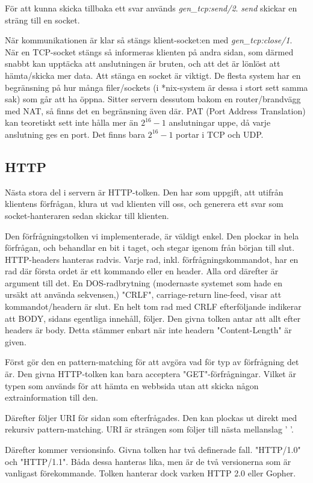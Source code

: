 \documentclass[a4paper, 11pt]{article}
\begin{document}
För att kunna skicka tillbaka ett svar används \emph{gen\_tcp:send/2}. \emph{send} skickar en sträng till en socket.

När kommunikationen är klar så stängs klient-socket:en med \emph{gen\_tcp:close/1}. När en TCP-socket stängs
så informeras klienten på andra sidan, som därmed snabbt kan upptäcka att anslutningen är bruten, och att
det är lönlöst att hämta/skicka mer data. Att stänga en socket är viktigt. De flesta system har en begränsning
på hur många filer/sockets (i *nix-system är dessa i stort sett samma sak) som går att ha öppna. Sitter servern
dessutom bakom en router/brandvägg med NAT, så finns det en begränsning även där. PAT (Port Address Translation) kan teoretiskt sett
inte hålla mer än $2^{16} - 1$ anslutningar uppe, då varje anslutning ges en port. Det finns bara $2^{16} - 1$ portar
i TCP och UDP.


\subsection{HTTP}

Nästa stora del i servern är HTTP-tolken. Den har som uppgift, att utifrån klientens förfrågan, klura ut vad klienten vill oss, och generera ett svar som socket-hanteraren sedan skickar till klienten.

Den förfrågningstolken vi implementerade, är väldigt enkel. Den plockar in hela förfrågan, och behandlar en bit i taget, och stegar igenom från början till slut.
HTTP-headers hanteras radvis. Varje rad, inkl. förfrågningskommandot, har en rad där första ordet är ett kommando eller en header. Alla ord därefter är argument till det.
En DOS-radbrytning (modernaste systemet som hade en ursäkt att använda sekvensen,) "CRLF", carriage-return line-feed, visar att kommandot/headern är slut.
En helt tom rad med CRLF efterföljande indikerar att BODY, sidans egentliga innehåll, följer. Den givna tolken antar att allt efter headers är body. Detta stämmer
enbart när inte headern "Content-Length" är given.

Först gör den en pattern-matching för att avgöra vad för typ av förfrågning det är. Den givna HTTP-tolken kan bara acceptera "GET"-förfrågningar. Vilket är
typen som används för att hämta en webbsida utan att skicka någon extrainformation till den.

Därefter följer URI för sidan som efterfrågades. Den kan plockas ut direkt med rekursiv pattern-matching. URI är strängen som följer till nästa mellanslag ' '.

Därefter kommer versionsinfo. Givna tolken har två definerade fall. "HTTP/1.0" och "HTTP/1.1". Båda dessa hanteras lika, men är de två versionerna som är vanligast förekommande.
Tolken hanterar dock varken HTTP 2.0 eller Gopher.
\end{document}
